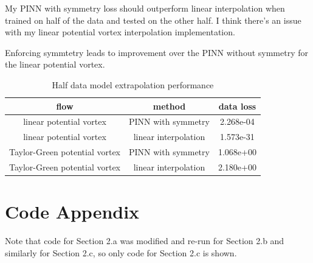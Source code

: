 \documentclass[11pt]{article}
\begin{document}
My PINN with symmetry loss should outperform linear interpolation when trained on half of the data and tested on the other half. I think there's an issue with my linear potential vortex interpolation implementation.

Enforcing symmtetry leads to improvement over the PINN without symmetry for the linear potential vortex.

\begin{table}[H]
    \centering
    \caption{Half data model extrapolation performance}
    \begin{tabular}{|c|c|c|}
        \hline
        flow & method & data loss \\
        \hline
        \hline
        linear potential vortex & PINN with symmetry & 2.268e-04 \\
        linear potential vortex & linear interpolation & 1.573e-31 \\
        Taylor-Green potential vortex & PINN with symmetry & 1.068e+00 \\
        Taylor-Green potential vortex & linear interpolation & 2.180e+00 \\
        \hline
    \end{tabular}
    \label{tab1d}
\end{table}


\section*{Code Appendix}

Note that code for Section 2.a was modified and re-run for Section 2.b and similarly for Section 2.c, so only code for Section 2.c is shown.



\end{document}
